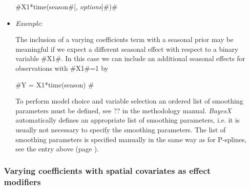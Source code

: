 \begin{itemize}
#X1*time(season#[, {\em options}]#)#
\item[] {\em Example}:

The inclusion of a varying coefficients term with a seasonal prior
may be meaningful if we expect a different seasonal effect with
respect to a binary variable #X1#. In this case we can include an
additional seasonal effects for observations with #X1#=1 by

#Y = X1*time(season) #

To perform model choice and variable selection an ordered list of smoothing parameters must be defined, see ??
in the methodology manual. {\em BayesX} automatically defines an appropriate list of smoothing parameters, i.e. it
is usually not necessary to  specify the smoothing parameters.
The list of smoothing parameters is specified manually in the same way as for P-splines,
see the entry above (page \pageref{psplines_stepwise}).
\end{itemize}

\subsubsection*{ Varying coefficients with spatial covariates as
effect modifiers}

